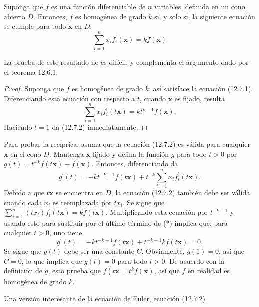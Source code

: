 \begin{theorem}
Suponga que $f$ es una función diferenciable de $n$ variables, definida en un cono abierto $D$. Entonces, $f$ es homogénea de grado $k$ si, y solo si, la siguiente ecuación se cumple para todo $\bm{x}$ en $D$:
\begin{equation}
\sum_{i=1}^{n}x_{i}f^{\prime}_{i}\left(\bm{x}\right)=kf\left(\bm{x}\right)
\end{equation}
\end{theorem}
La prueba de este resultado no es difícil, y complementa el argumento dado por el teorema 12.6.1:

\begin{proof}
Suponga que $f$ es homogénea de grado $k$, así satisface la ecuación (12.7.1). Diferenciando esta ecuación con respecto a $t$, cuando $\bm{x}$ es fijado, resulta \[ \sum_{i=1}^{n}x_{i}f^{\prime}_{i}\left(t\bm{x}\right)=kt^{k-1}f\left(\bm{x}\right). \] Haciendo $t=1$ da (12.7.2) inmediatamente.
\end{proof}

Para probar la recíprica, asuma que la ecuación (12.7.2) es válida para cualquier $\bm{x}$ en el cono $D$. Mantenga $\bm{x}$ fijado y defina la función $g$ para todo $t>0$ por $g\left(t\right)=t^{-k}f\left(t\bm{x}\right)-f\left(\bm{x}\right)$. Entonces, diferenciando da
\begin{equation}
g^{\prime}\left(t\right)=-kt^{-k-1}f\left(t\bm{x}\right)+t^{-k}\sum_{i=1}^{n}x_{i}f^{\prime}_{i}\left(t\bm{x}\right).
\end{equation}
Debido a que $t\bm{x}$ se encuentra en $D$, la ecuación (12.7.2) también debe ser válida cuando cada $x_{i}$ es reemplazada por $tx_{i}$. Se sigue que $\sum_{i=1}^{n}\left(tx_{i}\right)f^{\prime}_{i}\left(t\bm{x}\right)=kf\left(t\bm{x}\right)$. Multiplicando esta ecuación por $t^{-k-1}$ y usando esto para sustituir por el último término de (*) implica que, para cualquier $t>0$, uno tiene \[ g^{\prime}\left(t\right)=-kt^{-k-1}f\left(t\bm{x}\right)+t^{-k-1}kf\left(t\bm{x}\right)=0. \] Se sigue que $g\left(t\right)$ debe ser una constante $C$. Obviamente, $g\left(1\right)=0$, así que $C=0$, lo que implica que $g\left(t\right)=0$ para todo $t>0$. De acuerdo con la definición de $g$, esto prueba que $f\left(t\bm{x}=t^{k}f\left(\bm{x}\right)$, así que $f$ en realidad es homogénea de grado $k$.

Una versión interesante de la ecuación de Euler, ecuación (12.7.2) %